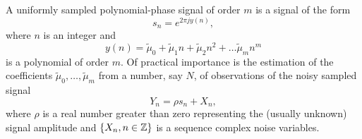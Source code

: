 \documentclass[journal]{IEEEtran}
\begin{document}
A uniformly sampled polynomial-phase signal of order $m$ is a signal of the form
\[
s_n = e^{2\pi j y(n)},
\] 
where $n$ is an integer and 
\[
y(n) = \tilde{\mu}_0 +\tilde{\mu}_1 n + \tilde{\mu}_2 n^2 + \dots \tilde{\mu}_m n^m
\]
is a polynomial of order $m$.  Of practical importance is the estimation of the coefficients $\tilde{\mu}_0, \dots, \tilde{\mu}_m$ from a number, say $N$, of observations of the noisy sampled signal
\begin{equation}\label{eq:Y_nsamplednoisey}
Y_n = \rho s_n + X_n,
\end{equation}
where $\rho$ is a real number greater than zero representing the (usually unknown) signal amplitude and $\{X_n, n \in {\mathbb Z}\}$ is a sequence complex noise variables.  %
\end{document}
